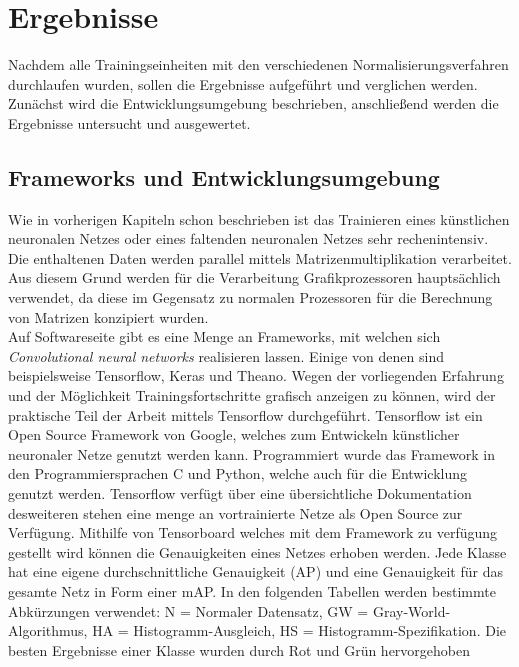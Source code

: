 \chapter{Ergebnisse}\label{s.ergebnisse}
Nachdem alle Trainingseinheiten mit den verschiedenen Normalisierungsverfahren durchlaufen wurden, sollen die Ergebnisse aufgeführt und verglichen werden. Zunächst wird die Entwicklungsumgebung beschrieben, anschließend werden die Ergebnisse untersucht und ausgewertet. 
\section{Frameworks und Entwicklungsumgebung}\label{s.entwicklung}
Wie in vorherigen Kapiteln schon beschrieben ist das Trainieren eines künstlichen neuronalen Netzes oder eines faltenden neuronalen Netzes sehr rechenintensiv. Die enthaltenen Daten werden parallel mittels Matrizenmultiplikation verarbeitet. Aus diesem Grund werden für die Verarbeitung Grafikprozessoren hauptsächlich verwendet, da diese im Gegensatz zu normalen Prozessoren für die Berechnung von Matrizen konzipiert wurden.\\
Auf Softwareseite gibt es eine Menge an Frameworks, mit welchen sich \textit{Convolutional neural networks} realisieren lassen. Einige von denen sind beispielsweise Tensorflow, Keras und Theano. Wegen der vorliegenden Erfahrung und der Möglichkeit Trainingsfortschritte grafisch anzeigen zu können, wird der praktische Teil der Arbeit mittels Tensorflow durchgeführt. Tensorflow ist ein Open Source Framework von Google, welches zum Entwickeln künstlicher neuronaler Netze genutzt werden kann. Programmiert wurde das Framework in den Programmiersprachen C und Python, welche auch für die Entwicklung genutzt werden. Tensorflow verfügt über eine übersichtliche Dokumentation desweiteren stehen eine menge an vortrainierte Netze als Open Source zur Verfügung. Mithilfe von Tensorboard welches mit dem Framework zu verfügung gestellt wird können die Genauigkeiten eines Netzes erhoben werden. Jede Klasse hat eine eigene durchschnittliche Genauigkeit (AP) und eine Genauigkeit für das gesamte Netz in Form einer mAP. In den folgenden Tabellen werden bestimmte Abkürzungen verwendet: N = Normaler Datensatz, GW = Gray-World-Algorithmus, HA = Histogramm-Ausgleich, HS = Histogramm-Spezifikation. Die besten Ergebnisse einer Klasse wurden durch Rot und Grün hervorgehoben  
